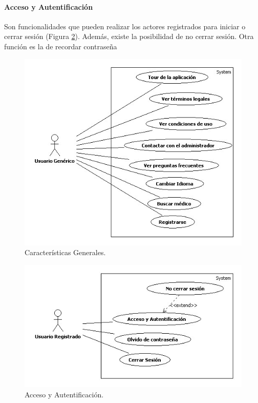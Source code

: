 
				\paragraph{Acceso y Autentificación} %
				\label{par:acceso_y_autentificacion}
					Son funcionalidades que pueden realizar los actores registrados para iniciar o cerrar sesión (Figura \ref{fig:acceso}). Además, existe la posibilidad de no cerrar sesión. Otra función es la de recordar contraseña
					\begin{figure}[H]
					  \centering
					    \includegraphics[width=12cm]{img/jpg/casos_uso/Generales.jpg}
					  \caption{Características Generales.}
					  \label{fig:caracteristicas}
					\end{figure}

					\begin{figure}[H]
					  \centering
					    \includegraphics[width=12cm]{img/jpg/casos_uso/Acceso_y_Autentificacion.jpg}
					  \caption{Acceso y Autentificación.}
					  \label{fig:acceso}
					\end{figure}

